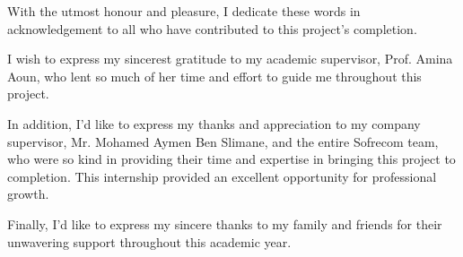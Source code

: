 
\center
With the utmost honour and pleasure, I dedicate these words in acknowledgement to all who have contributed to this project's completion.

I wish to express my sincerest gratitude to my academic supervisor, Prof. Amina Aoun, who lent so much of her time and effort to guide me throughout this project.

In addition, I'd like to express my thanks and appreciation to my company supervisor, Mr. Mohamed Aymen Ben Slimane, and the entire Sofrecom team, who were so kind in providing their time and expertise in bringing this project to completion. This internship provided an excellent opportunity for professional growth.

Finally, I'd like to express my sincere thanks to my family and friends for their unwavering support throughout this academic year.